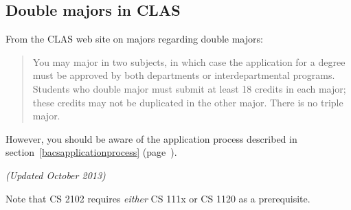 \subsection{Double majors in CLAS}

From the CLAS web site on
majors
regarding double majors:

\begin{quotation}
\noindent You may major in two subjects, in which case the application
for a degree must be approved by both departments or inter\-departmental
programs. Students who double major must submit at least 18 credits in
each major; these credits may not be duplicated in the other
major. There is no triple major.
\end{quotation}

However, you should be aware of the application process described in
section~\ref{bacsapplicationprocess}
(page~\pageref{bacsapplicationprocess}).


\begin{figure*}[h!]
\label{fig:barequirementsflowchart}
{\em (Updated October 2013)}
\begin{center}
\end{center}
\end{figure*}

Note that CS 2102 requires {\em either} CS 111x or CS 1120 as a
prerequisite.
